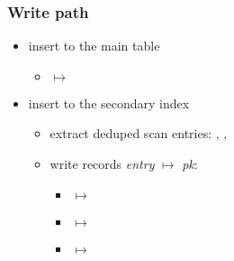 \begin{frame}
  \titlepage
  \hypertarget{titlePage}{}
\end{frame}

\begin{frame}
  \frametitle{Write path}

  \pause

  \pause

  \begin{itemize}
    \item insert to the main table
      \pause
      \begin{itemize}
        \item {} $\mapsto$ 
      \end{itemize}
      \pause
    \item insert to the secondary index
      \pause
      \begin{itemize}
        \item extract deduped scan entries: , ,
          \pause
        \item write records \emph{entry} $\mapsto$ \emph{pk}:
          \pause
          \begin{itemize}
            \item {} $\mapsto$ 
              \pause
            \item {} $\mapsto$ 
              \pause
            \item {} $\mapsto$ 
          \end{itemize}
      \end{itemize}
  \end{itemize}
\end{frame}

